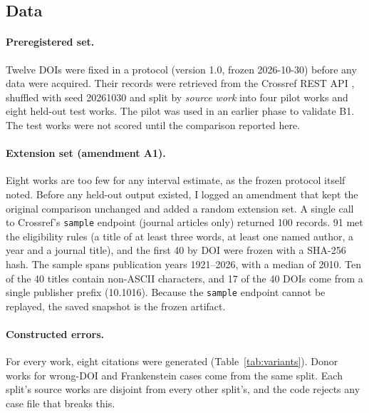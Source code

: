 \documentclass[acmsmall,screen,nonacm]{acmart}
\newcommand{\BOne}{B1}
\begin{document}
\subsection{Data}
\paragraph{Preregistered set.} Twelve DOIs were fixed in a protocol (version 1.0, frozen 2026-10-30) before any data were acquired. Their records were retrieved from the Crossref REST API \citep{crossrefapi}, shuffled with seed 20261030 and split by \emph{source work} into four pilot works and eight held-out test works. The pilot was used in an earlier phase to validate \BOne{}. The test works were not scored until the comparison reported here.

\paragraph{Extension set (amendment A1).} Eight works are too few for any interval estimate, as the frozen protocol itself noted. Before any held-out output existed, I logged an amendment that kept the original comparison unchanged and added a random extension set. A single call to Crossref's \texttt{sample} endpoint (journal articles only) returned 100 records. 91 met the eligibility rules (a title of at least three words, at least one named author, a year and a journal title), and the first 40 by DOI were frozen with a SHA-256 hash. The sample spans publication years 1921--2026, with a median of 2010. Ten of the 40 titles contain non-ASCII characters, and 17 of the 40 DOIs come from a single publisher prefix (10.1016). Because the \texttt{sample} endpoint cannot be replayed, the saved snapshot is the frozen artifact.

\paragraph{Constructed errors.} For every work, eight citations were generated (Table~\ref{tab:variants}). Donor works for wrong-DOI and Frankenstein cases come from the same split. Each split's source works are disjoint from every other split's, and the code rejects any case file that breaks this.
\end{document}
